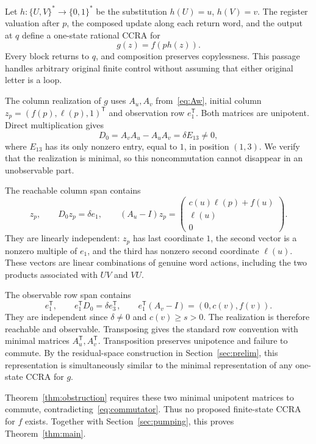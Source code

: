 \documentclass[acmlarge,screen,11pt,nonacm]{acmart}
\theoremstyle{definition}
\begin{document}
Let $h:\{U,V\}^*\to\{0,1\}^*$ be the substitution $h(U)=u$, $h(V)=v$. The register valuation after $p$, the composed update along each return word, and the output at $q$ define a one-state rational CCRA for
\[
 g(z)=f(p h(z)).
\]
Every block returns to $q$, and composition preserves copylessness. This passage handles arbitrary original finite control without assuming that either original letter is a loop.

The column realization of $g$ uses $A_u,A_v$ from~\eqref{eq:Aw}, initial column $z_p=(f(p),\ell(p),1)^\mathsf{T}$ and observation row $e_1^\mathsf{T}$. Both matrices are unipotent. Direct multiplication gives
\begin{equation}\label{eq:commutator}
 D_0=A_vA_u-A_uA_v=\delta E_{13}\ne0,
\end{equation}
where $E_{13}$ has its only nonzero entry, equal to $1$, in position $(1,3)$. We verify that the realization is minimal, so this noncommutation cannot disappear in an unobservable part.

The reachable column span contains
\[
 z_p,\qquad D_0z_p=\delta e_1,\qquad
 (A_u-I)z_p=\begin{pmatrix}c(u)\ell(p)+f(u)\\\ell(u)\\0\end{pmatrix}.
\]
They are linearly independent: $z_p$ has last coordinate $1$, the second vector is a nonzero multiple of $e_1$, and the third has nonzero second coordinate $\ell(u)$. These vectors are linear combinations of genuine word actions, including the two products associated with $UV$ and $VU$.

The observable row span contains
\[
 e_1^\mathsf{T},\qquad e_1^\mathsf{T}D_0=\delta e_3^\mathsf{T},\qquad
 e_1^\mathsf{T}(A_v-I)=(0,c(v),f(v)).
\]
They are independent since $\delta\ne0$ and $c(v)\geq s>0$. The realization is therefore reachable and observable. Transposing gives the standard row convention with minimal matrices $A_u^\mathsf{T},A_v^\mathsf{T}$. Transposition preserves unipotence and failure to commute. By the residual-space construction in Section~\ref{sec:prelim}, this representation is simultaneously similar to the minimal representation of any one-state CCRA for $g$.

Theorem~\ref{thm:obstruction} requires these two minimal unipotent matrices to commute, contradicting~\eqref{eq:commutator}. Thus no proposed finite-state CCRA for $f$ exists. Together with Section~\ref{sec:pumping}, this proves Theorem~\ref{thm:main}.
\end{document}
